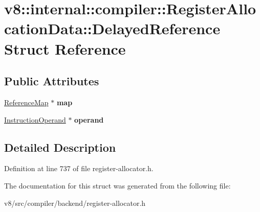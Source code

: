\hypertarget{structv8_1_1internal_1_1compiler_1_1RegisterAllocationData_1_1DelayedReference}{}\section{v8\+:\+:internal\+:\+:compiler\+:\+:Register\+Allocation\+Data\+:\+:Delayed\+Reference Struct Reference}
\label{structv8_1_1internal_1_1compiler_1_1RegisterAllocationData_1_1DelayedReference}
\subsection*{Public Attributes}
\begin{DoxyCompactItemize}
\item 
\mbox{\label{structv8_1_1internal_1_1compiler_1_1RegisterAllocationData_1_1DelayedReference_a4817fbb935247a7ff68c97e11f5cf69d}} 
\mbox{\hyperlink{classv8_1_1internal_1_1compiler_1_1ReferenceMap}{Reference\+Map}} $\ast$ {\bfseries map}
\item 
\mbox{\label{structv8_1_1internal_1_1compiler_1_1RegisterAllocationData_1_1DelayedReference_a74f07c5a15df2b44eb91e07da2a8e352}} 
\mbox{\hyperlink{classv8_1_1internal_1_1compiler_1_1InstructionOperand}{Instruction\+Operand}} $\ast$ {\bfseries operand}
\end{DoxyCompactItemize}


\subsection{Detailed Description}


Definition at line 737 of file register-\/allocator.\+h.



The documentation for this struct was generated from the following file\+:\begin{DoxyCompactItemize}
\item 
v8/src/compiler/backend/register-\/allocator.\+h\end{DoxyCompactItemize}
